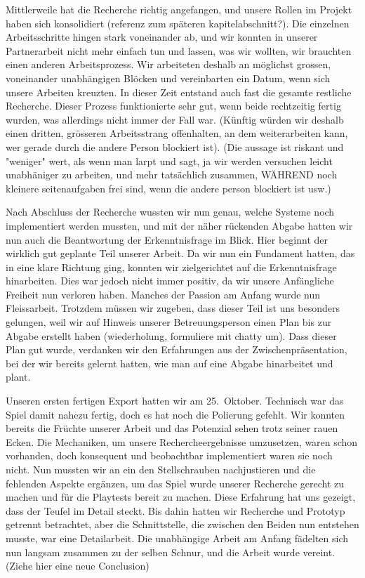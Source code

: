 \documentclass[../Main.tex]{subfiles}
\begin{document}
Mittlerweile hat die Recherche richtig angefangen, und unsere Rollen im Projekt haben sich konsolidiert (referenz zum späteren kapitelabschnitt?). Die einzelnen Arbeitsschritte hingen stark voneinander ab, und wir konnten in unserer Partnerarbeit nicht mehr einfach tun und lassen, was wir wollten, wir brauchten einen anderen Arbeitsprozess. Wir arbeiteten deshalb an möglichst grossen, voneinander unabhängigen Blöcken und vereinbarten ein Datum, wenn sich unsere Arbeiten kreuzten. In dieser Zeit entstand auch fast die gesamte restliche Recherche. Dieser Prozess funktionierte sehr gut, wenn beide rechtzeitig fertig wurden, was allerdings nicht immer der Fall war. (Künftig würden wir deshalb einen dritten, grösseren Arbeitsstrang offenhalten, an dem weiterarbeiten kann, wer gerade durch die andere Person blockiert ist). (Die aussage ist riskant und "weniger" wert, als wenn man larpt und sagt, ja wir werden versuchen leicht unabhäniger zu arbeiten, und mehr tatsächlich zusammen, WÄHREND noch kleinere seitenaufgaben frei sind, wenn die andere person blockiert ist usw.)

Nach Abschluss der Recherche wussten wir nun genau, welche Systeme noch implementiert werden mussten, und mit der näher rückenden Abgabe hatten wir nun auch die Beantwortung der Erkenntnisfrage im Blick. Hier beginnt der wirklich gut geplante Teil unserer Arbeit. Da wir nun ein Fundament hatten, das in eine klare Richtung ging, konnten wir zielgerichtet auf die Erkenntnisfrage hinarbeiten. Dies war jedoch nicht immer positiv, da wir unsere Anfängliche Freiheit nun verloren haben. Manches der Passion am Anfang wurde nun Fleissarbeit. Trotzdem müssen wir zugeben, dass dieser Teil ist uns besonders gelungen, weil wir auf Hinweis unserer Betreuungsperson einen Plan bis zur Abgabe erstellt haben (wiederholung, formuliere mit chatty um). Dass dieser Plan gut wurde, verdanken wir den Erfahrungen aus der Zwischenpräsentation, bei der wir bereits gelernt hatten, wie man auf eine Abgabe hinarbeitet und plant.

Unseren ersten fertigen Export hatten wir am 25.~Oktober. Technisch war das Spiel damit nahezu fertig, doch es hat noch die Polierung gefehlt. Wir konnten bereits die Früchte unserer Arbeit und das Potenzial sehen trotz seiner rauen Ecken. Die Mechaniken, um unsere Rechercheergebnisse umzusetzen, waren schon vorhanden, doch konsequent und beobachtbar implementiert waren sie noch nicht. Nun mussten wir an ein den Stellschrauben nachjustieren und die fehlenden Aspekte ergänzen, um das Spiel wurde unserer Recherche gerecht zu machen und für die Playtests bereit zu machen. Diese Erfahrung hat uns gezeigt, dass der Teufel im Detail steckt. Bis dahin hatten wir Recherche und Prototyp getrennt betrachtet, aber die Schnittstelle, die zwischen den Beiden nun entstehen musste, war eine Detailarbeit. Die unabhängige Arbeit am Anfang fädelten sich nun langsam zusammen zu der selben Schnur, und die Arbeit wurde vereint. (Ziehe hier eine neue Conclusion)
\end{document}
